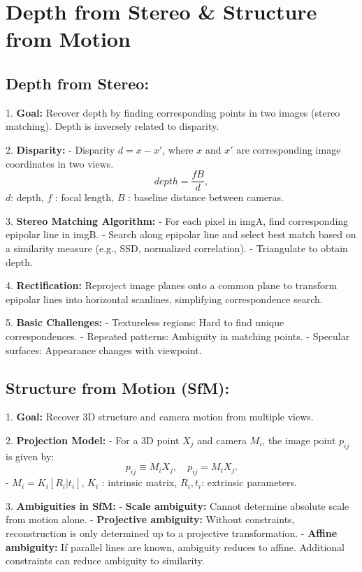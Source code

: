 \section{Depth from Stereo \& Structure from Motion}

\subsection*{Depth from Stereo:}
1. \textbf{Goal:} Recover depth by finding corresponding points in two images (stereo matching). Depth is inversely related to disparity.
   
2. \textbf{Disparity:} 
   - Disparity \( d = x - x' \), where \( x \) and \( x' \) are corresponding image coordinates in two views.
     \[
     depth = \frac{f B}{d},
     \]
     \(d\): depth, \( f \) : focal length, \( B \) : baseline distance between cameras.

3. \textbf{Stereo Matching Algorithm:}
   - For each pixel in imgA, find corresponding epipolar line in imgB.
   - Search along epipolar line and select  best match based on a similarity measure (e.g., SSD, normalized correlation).
   - Triangulate to obtain depth.

4. \textbf{Rectification:} Reproject image planes onto a common plane to transform epipolar lines into horizontal scanlines, simplifying correspondence search.

5. \textbf{Basic Challenges:}
   - Textureless regions: Hard to find unique correspondences.
   - Repeated patterns: Ambiguity in matching points.
   - Specular surfaces: Appearance changes with viewpoint.

\subsection*{Structure from Motion (SfM):}
1. \textbf{Goal:} Recover 3D structure and camera motion from multiple views.

2. \textbf{Projection Model:}
   - For a 3D point \( X_j \) and camera \( M_i \), the image point \( p_{ij} \) is given by:
     \[
     p_{ij} \equiv M_i X_j, \quad p_{ij} = M_i X_j.
     \]
   - \( M_i = K_i [R_i | t_i] \), \( K_i \) : intrinsic matrix,  \( R_i, t_i \): extrinsic parameters.

3. \textbf{Ambiguities in SfM:}
   - \textbf{Scale ambiguity:} Cannot determine absolute scale from motion alone.
   - \textbf{Projective ambiguity:} Without constraints, reconstruction is only determined up to a projective transformation.
   - \textbf{Affine ambiguity:} If parallel lines are known, ambiguity reduces to affine. Additional constraints can reduce ambiguity to similarity.

